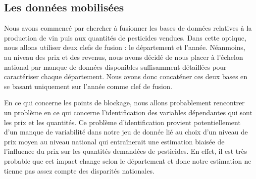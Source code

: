 \documentclass[11pt, a4paper]{article}
\begin{document}
\subsection{Les données mobilisées}
Nous avons commencé par chercher à fusionner les bases de données relatives à la production de vin puis aux quantités de pesticides vendues. 
Dans cette optique, nous allons utiliser deux clefs de fusion : le département et l’année. 
Néanmoins, au niveau des prix et des revenus, nous avons décidé de nous placer à l’échelon national par manque de données disponibles suffisamment détaillées pour caractériser chaque département. 
Nous avons donc concaténer ces deux bases en se basant uniquement sur l’année comme clef de fusion.
\par
En ce qui concerne les points de blockage, nous allons probablement rencontrer un problème en ce qui concerne l’identification des variables dépendantes qui sont les prix et les quantités. 
Ce problème d’identification provient potentiellement d’un manque de variabilité dans notre jeu de donnée lié au choix d’un niveau de prix moyen au niveau  national  qui entraînerait une estimation biaisée de l’influence du prix sur les quantités demandées de pesticides. 
En effet, il est très probable que cet impact change selon le département et donc notre estimation ne tienne pas assez compte des disparités nationales.
\end{document}
